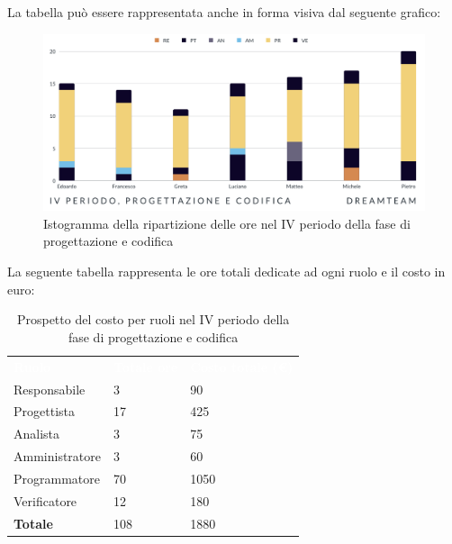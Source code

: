 La tabella può essere rappresentata anche in forma visiva dal seguente grafico:
\begin{figure}[H]
\centering
\includegraphics[scale=0.65]{Sezioni/SezioniPreventivo/grafici/Progettazione_codifica_IV_periodo.png}
\caption{Istogramma della ripartizione delle ore nel IV periodo della fase di progettazione e codifica}
\end{figure}

La seguente tabella rappresenta le ore totali dedicate ad ogni ruolo e il costo in euro:

\begin{table}[H]
\begin{center}
\renewcommand{\arraystretch}{1.5}
\begin{tabular}{ m{}<{\centering}  m{}<{\centering} m{}<{\centering}}
	\rowcolor{darkblue}
	\textcolor{white}{\textbf{Ruolo}}&\textcolor{white}{\textbf{Totale ore}}&\textcolor{white}{\textbf{Costo totale (\euro)}}\\ 

	Responsabile  & 3 & 90 \\	
	
	Progettista & 17 & 425 \\
	
	Analista & 3 & 75 \\

	Amministratore & 3 & 60 \\
	
	Programmatore & 70 & 1050 \\
	
	Verificatore & 12 & 180 \\
	
	\textbf{Totale} & 108 & 1880\\
	
\end{tabular}
\caption{Prospetto del costo per ruoli nel IV periodo della fase di progettazione e codifica}
\end{center}
\end{table}

